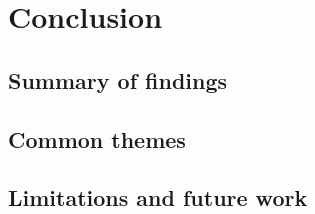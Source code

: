 \chapter{Conclusion}
\label{ch:conclusion}


\section{Summary of findings}
\label{sec:conclusion:summary}

\section{Common themes}
\label{sec:conclusion:themes}


\section{Limitations and future work}
\label{sec:conclusion:future}
